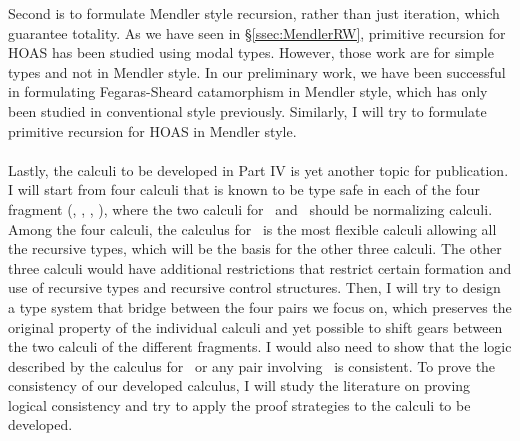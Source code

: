 Second is to formulate Mendler style recursion, rather than just iteration,
which guarantee totality. As we have seen in \S\ref{ssec:MendlerRW}, primitive
recursion for HOAS has been studied using modal types. However, those work are
for simple types and not in Mendler style. In our preliminary work, we have
been successful in formulating Fegaras-Sheard catamorphism in Mendler style,
which has only been studied in conventional style previously. Similarly,
I will try to formulate primitive recursion for HOAS in Mendler style.

\paragraph{}
Lastly, the calculi to be developed in Part IV is yet another topic for
publication. I will start from four calculi that is known to be type safe
in each of the four fragment (\IND, \INDbot, \REC, \RECbot), where the two
calculi for \IND\ and \REC\ should be normalizing calculi. Among the four
calculi, the calculus for \RECbot\ is the most flexible calculi allowing
all the recursive types, which will be the basis for the other three calculi.
The other three calculi would have additional restrictions that restrict certain
formation and use of recursive types and recursive control structures. Then, I
will try to design a type system that bridge between the four pairs we focus on,
which preserves the original property of the individual calculi and yet
possible to shift gears between the two calculi of the different fragments.
I would also need to show that the logic described by the calculus for \IND\,
or any pair involving \IND\, is consistent. To prove the consistency of our
developed calculus, I will study the literature on proving logical consistency
and try to apply the proof strategies to the calculi to be developed.

